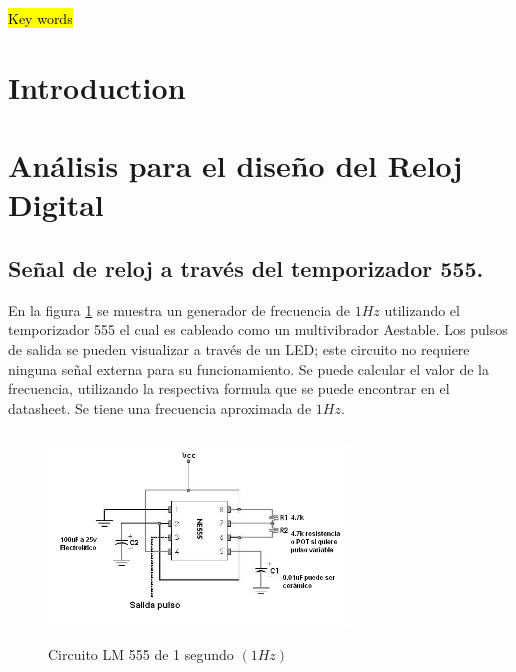 \begin{IEEEkeywords}
\hl{Key words}
\end{IEEEkeywords}

\IEEEpeerreviewmaketitle

\section{Introduction}

\section{Análisis para el diseño del Reloj Digital}
\subsection{Señal de reloj a través del temporizador 555.}
En la figura \ref{circuit_diagram} se muestra un generador de frecuencia de $1Hz$ utilizando el temporizador 555 el cual es cableado como un multivibrador Aestable.  Los pulsos de salida se pueden visualizar a través de un LED; este circuito no requiere ninguna señal externa para su funcionamiento.   Se puede calcular el valor de la frecuencia, utilizando la respectiva formula que se puede encontrar en el datasheet. Se tiene una frecuencia aproximada de $1Hz$.

\begin{figure}[h]
    \begin{center}
    \includegraphics[width=8cm, height=5.5cm]{images/image1.png}
    \newline
    \caption{Circuito LM 555 de 1 segundo $\left ( 1Hz \right )$}\label{circuit_diagram}
    \end{center}
\end{figure}


